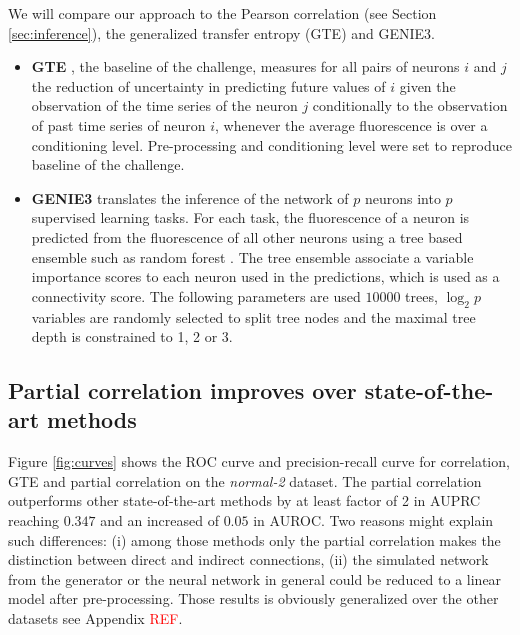 \documentclass[wcp]{jmlr}
\begin{document}
We will compare our approach to the Pearson correlation (see Section
\ref{sec:inference}), the generalized transfer entropy (GTE) and GENIE3.
\begin{itemize}
\item \textbf{GTE} \citep{stetter2012model}
, the baseline of the challenge, measures for all pairs of
neurons $i$ and $j$ the reduction of uncertainty in predicting future values of
$i$ given the observation of the time series of the neuron $j$
conditionally to the observation of past time series of neuron $i$,
whenever the average fluorescence is over a conditioning level.
Pre-processing and conditioning level were set to reproduce baseline of the
challenge.

\item \textbf{GENIE3} \citep{huynhthu2010inferring} translates the inference of the
network of $p$ neurons into $p$ supervised learning tasks. For each task,
the fluorescence of a neuron is predicted from the fluorescence
of all other neurons using a tree based ensemble such as
random forest \citep{breiman2001random}. The tree ensemble associate a
variable importance scores \citep{louppe2013understanding}
to each neuron used in the predictions, which is used as a connectivity
score. The following parameters are used
$10000$ trees, $\log_2{p}$ variables are randomly selected to split tree
nodes and the maximal tree depth is constrained to 1, 2 or 3.
\end{itemize}


\subsection*{Partial correlation improves over state-of-the-art methods}

Figure \ref{fig:curves} shows the ROC curve  and precision-recall curve
for correlation, GTE and partial correlation on the \textit{normal-2}
dataset. The partial correlation outperforms other state-of-the-art methods
by at least factor of 2 in AUPRC reaching $0.347$ and an increased of $0.05$ in
AUROC. Two reasons might explain such differences: (i) among
those methods only the partial correlation makes the distinction between
direct and indirect connections, (ii) the simulated network from the
\citep{stetter2012model} generator or the neural network in general could be
reduced to a linear model after pre-processing. Those results is obviously
generalized over the other datasets see Appendix \textcolor{red}{REF}.
\end{document}
